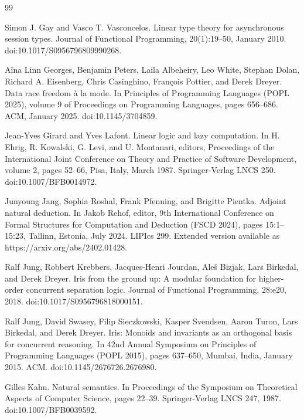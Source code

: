 \documentclass[10pt,a4paper]{amsart}
\begin{document}
\begin{thebibliography}{99}
\par\noindent  [16]  Simon J. Gay and Vasco T. Vasconcelos.  Linear type theory for asynchronous session types.  Journal of Functional Programming, 20(1):19–50, January 2010.  doi:10.1017/S0956796809990268.  
 
\par\noindent  [17]  Aïna Linn Georges, Benjamin Peters, Laila Albeheiry, Leo White, Stephan Dolan, Richard A. Eisenberg, Chris Casinghino, François Pottier, and Derek Dreyer.  Data race freedom à la mode.  In Principles of Programming Languages (POPL 2025), volume 9 of Proceedings on Programming Languages, pages 656–686. ACM, January 2025.  doi:10.1145/3704859.  
 
\par\noindent  [18]  Jean-Yves Girard and Yves Lafont.  Linear logic and lazy computation.  In H. Ehrig, R. Kowalski, G. Levi, and U. Montanari, editors, Proceedings of the International Joint Conference on Theory and Practice of Software Development, volume 2, pages 52–66, Pisa, Italy, March 1987. Springer-Verlag LNCS 250.  doi:10.1007/BFB0014972.  
 
\par\noindent  [19]  Junyoung Jang, Sophia Roshal, Frank Pfenning, and Brigitte Pientka.  Adjoint natural deduction.  In Jakob Rehof, editor, 9th International Conference on Formal Structures for Computation and Deduction (FSCD 2024), pages 15:1–15:23, Tallinn, Estonia, July 2024. LIPIcs 299.  Extended version available as https://arxiv.org/abs/2402.01428.  
 
\par\noindent  [20]  Ralf Jung, Robbert Krebbers, Jacques-Henri Jourdan, Aleš Bizjak, Lars Birkedal, and Derek Dreyer.  Iris from the ground up: A modular foundation for higher-order concurrent separation logic.  Journal of Functional Programming, 28:e20, 2018.  doi:10.1017/S0956796818000151.  
 
\par\noindent  [21]  Ralf Jung, David Swasey, Filip Sieczkowski, Kasper Svendsen, Aaron Turon, Lars Birkedal, and Derek Dreyer.  Iris: Monoids and invariants as an orthogonal basis for concurrent reasoning.  In 42nd Annual Symposium on Principles of Programming Languages (POPL 2015), pages 637–650, Mumbai, India, January 2015. ACM.  doi:10.1145/2676726.2676980.  
 
\par\noindent  [22]  Gilles Kahn.  Natural semantics.  In Proceedings of the Symposium on Theoretical Aspects of Computer Science, pages 22–39. Springer-Verlag LNCS 247, 1987.  doi:10.1007/BFB0039592.  
 

\end{thebibliography}
\end{document}
